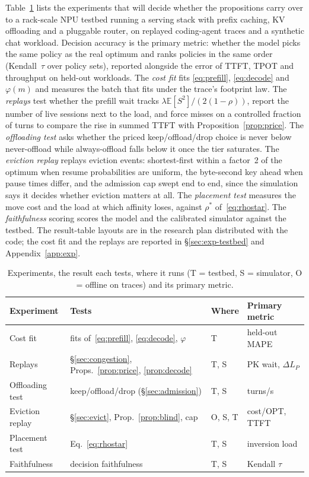 \documentclass{article}
\theoremstyle{plain}
\theoremstyle{definition}
\theoremstyle{remark}
\newcommand{\E}{\mathbb{E}}
\begin{document}
Table~\ref{tab:exp-overview} lists the experiments that will decide
whether the propositions carry over to a rack-scale NPU testbed running
a serving stack with prefix caching, KV offloading and a pluggable
router, on replayed coding-agent traces and a synthetic chat workload.
Decision accuracy is the primary metric: whether the model picks the
same policy as the real optimum and ranks policies in the same order
(Kendall~$\tau$ over policy sets), reported alongside the error of
TTFT, TPOT and throughput on held-out workloads. The \emph{cost fit}
fits \eqref{eq:prefill}, \eqref{eq:decode} and $\varphi(m)$ and
measures the batch that fits under the trace's footprint law. The
\emph{replays} test whether the prefill wait tracks
$\lambda\E[S^2]/(2(1-\rho))$, report the number of live sessions next
to the load, and force misses on a controlled fraction of turns to
compare the rise in summed TTFT with Proposition~\ref{prop:price}. The
\emph{offloading test} asks whether the priced keep/offload/drop choice
is never below never-offload while always-offload falls below it once
the tier saturates. The \emph{eviction replay} replays eviction events:
shortest-first within a factor~2 of the optimum when resume
probabilities are uniform, the byte-second key ahead when pause
times differ, and the admission cap swept end to end, since the
simulation says it decides whether eviction matters at all. The
\emph{placement test} measures the move cost and the load at which
affinity loses, against $\rho^*$ of~\eqref{eq:rhostar}. The
\emph{faithfulness} scoring scores the model and the calibrated
simulator against the testbed. The result-table layouts are in the
research plan distributed with the code; the cost fit and the replays
are reported in \S\ref{sec:exp-testbed} and Appendix~\ref{app:exp}.

\begin{table}[htbp]
\caption{Experiments, the result each tests, where it runs
(T = testbed, S = simulator, O = offline on traces) and its primary
metric.}
\label{tab:exp-overview}
\centering\scriptsize\setlength{\tabcolsep}{2.5pt}
\begin{tabular}{@{}llll@{}}
\toprule
Experiment & Tests & Where & Primary metric \\
\midrule
Cost fit & fits of~\eqref{eq:prefill}, \eqref{eq:decode}, $\varphi$ & T & held-out MAPE \\
Replays & \S\ref{sec:congestion}, Props.~\ref{prop:price}, \ref{prop:decode} & T, S & PK wait, $\Delta L_P$ \\
Offloading test & keep/offload/drop (\S\ref{sec:admission}) & T, S & turns/s \\
Eviction replay & \S\ref{sec:evict}, Prop.~\ref{prop:blind}, cap & O, S, T & cost/OPT, TTFT \\
Placement test & Eq.~\eqref{eq:rhostar} & T, S & inversion load \\
Faithfulness & decision faithfulness & T, S & Kendall $\tau$ \\
\bottomrule
\end{tabular}
\end{table}
\end{document}
